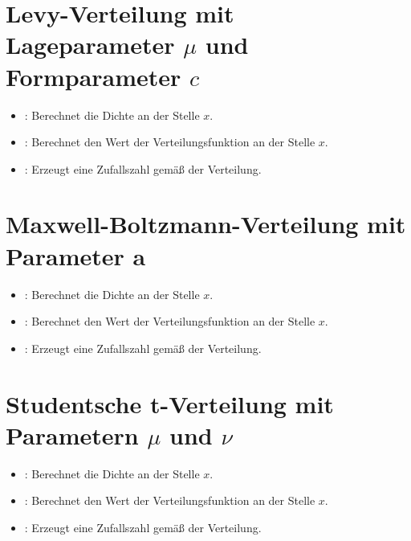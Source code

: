 \section{Levy-Verteilung mit Lageparameter \texorpdfstring{$\mu$}{mu} und Formparameter \texorpdfstring{$c$}{c}}

\begin{itemize}

\item
{}:
Berechnet die Dichte an der Stelle $x$.

\item
{}:
Berechnet den Wert der Verteilungsfunktion an der Stelle $x$.

\item
{}:
Erzeugt eine Zufallszahl gemäß der Verteilung.

\end{itemize}



\section{Maxwell-Boltzmann-Verteilung mit Parameter a}

\begin{itemize}

\item
{}:
Berechnet die Dichte an der Stelle $x$.

\item
{}:
Berechnet den Wert der Verteilungsfunktion an der Stelle $x$.

\item
{}:
Erzeugt eine Zufallszahl gemäß der Verteilung.

\end{itemize}



\section{Studentsche t-Verteilung mit Parametern \texorpdfstring{$\mu$}{mu} und \texorpdfstring{$\nu$}{nu}}

\begin{itemize}

\item
{}:
Berechnet die Dichte an der Stelle $x$.

\item
{}:
Berechnet den Wert der Verteilungsfunktion an der Stelle $x$.

\item
{}:
Erzeugt eine Zufallszahl gemäß der Verteilung.

\end{itemize}



